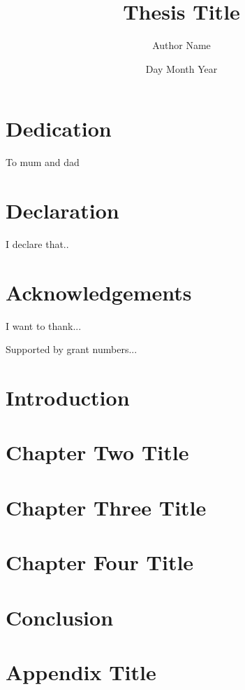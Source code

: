 \documentclass[11pt]{report}
\title{Thesis Title}
\author{Author Name}
\date{Day Month Year}
\begin{document}





\chapter*{Dedication}

To mum and dad

\chapter*{Declaration}

I declare that..

\chapter*{Acknowledgements}

I want to thank...

Supported by grant numbers...

\tableofcontents


\listoffigures


\listoftables

\doublespacing
\chapter{Introduction}


\chapter{Chapter Two Title}


\chapter{Chapter Three Title}


\chapter{Chapter Four Title}


\chapter{Conclusion}


\appendix
\chapter{Appendix Title}

\singlespacing
\printbibliography
\end{document}
